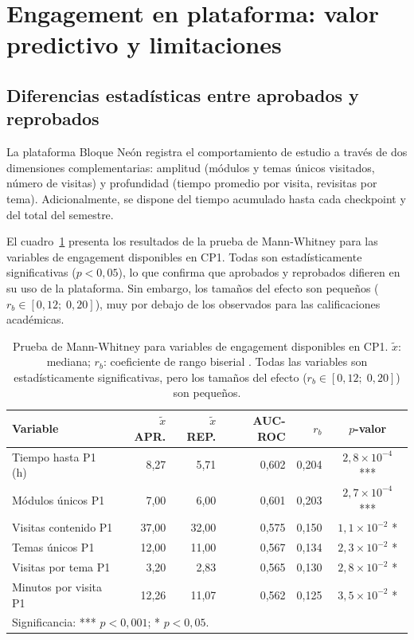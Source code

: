 \documentclass[12pt, letterpaper, openany]{report}
\begin{document}
\section{Engagement en plataforma: valor predictivo y limitaciones}

\subsection{Diferencias estadísticas entre aprobados y reprobados}

La plataforma Bloque Neón registra el comportamiento de estudio a través de dos dimensiones complementarias: amplitud (módulos y temas únicos visitados, número de visitas) y profundidad (tiempo promedio por visita, revisitas por tema). Adicionalmente, se dispone del tiempo acumulado hasta cada checkpoint y del total del semestre.

El cuadro~\ref{tab:mw_engagement} presenta los resultados de la prueba de Mann-Whitney para las variables de engagement disponibles en CP1. Todas son estadísticamente significativas ($p < 0{,}05$), lo que confirma que aprobados y reprobados difieren en su uso de la plataforma. Sin embargo, los tamaños del efecto son pequeños ($r_b \in [0{,}12;\;0{,}20]$), muy por debajo de los observados para las calificaciones académicas.

\begin{table}[!ht]
  \centering
  \caption{Prueba de Mann-Whitney para variables de engagement disponibles en CP1. $\tilde{x}$: mediana; $r_b$: coeficiente de rango biserial \cite{Kerby2014}. Todas las variables son estadísticamente significativas, pero los tamaños del efecto ($r_b \in [0{,}12;\;0{,}20]$) son pequeños.}
  \label{tab:mw_engagement}
  \begin{tabular}{lrrrrc}
    \toprule
    Variable & $\tilde{x}$ APR. & $\tilde{x}$ REP. & AUC-ROC & $r_b$ & $p$-valor \\
    \midrule
    Tiempo hasta P1 (h)   & 8,27  & 5,71  & 0,602 & 0,204 & $2{,}8\times10^{-4}$ *** \\
    Módulos únicos P1     & 7,00  & 6,00  & 0,601 & 0,203 & $2{,}7\times10^{-4}$ *** \\
    Visitas contenido P1  & 37,00 & 32,00 & 0,575 & 0,150 & $1{,}1\times10^{-2}$ *   \\
    Temas únicos P1       & 12,00 & 11,00 & 0,567 & 0,134 & $2{,}3\times10^{-2}$ *   \\
    Visitas por tema P1   &  3,20 &  2,83 & 0,565 & 0,130 & $2{,}8\times10^{-2}$ *   \\
    Minutos por visita P1 & 12,26 & 11,07 & 0,562 & 0,125 & $3{,}5\times10^{-2}$ *   \\
    \bottomrule
    \multicolumn{6}{l}{\footnotesize Significancia: *** $p < 0{,}001$; * $p < 0{,}05$.} \\
  \end{tabular}
\end{table}
\end{document}
